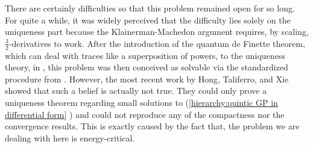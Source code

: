 \documentclass[12pt,letterpaper,leqno]{amsart}
\theoremstyle{plain}
\numberwithin{equation}{section}
\numberwithin{theorem}{section}
\numberwithin{proposition}{section}
\numberwithin{lemma}{section}
\numberwithin{corollary}{section}
\begin{document}
There are certainly difficulties so that this problem remained open for so
long. For quite a while, it was widely perceived that the difficulty lies
solely on the uniqueness part because the Klainerman-Machedon argument
requires, by scaling, $\frac{3}{2}$-derivatives to work. After the
introduction of the quantum de Finette theorem, which can deal with traces
like a superposition of powers, to the uniqueness theory, in \cite%
{TCNPdeFinitte}, this problem was then conceived as solvable via the
standardized procedure from \cite{E-S-Y2,Kirpatrick,TCNPdeFinitte}. However,
the most recent work \cite{HTX} by Hong, Taliferro, and Xie showed that such
a belief is actually not true. They could only prove a uniqueness theorem
regarding small solutions to (\ref{hierarchy:quintic GP in differential form}%
) and could not reproduce any of the compactness nor the convergence
results. This is exactly caused by the fact that, the problem we are dealing
with here is energy-critical.
\end{document}
